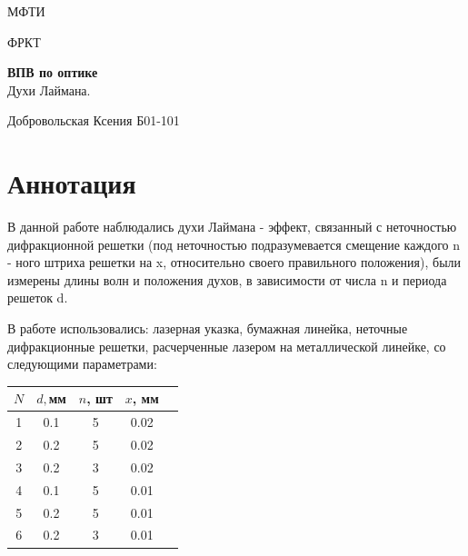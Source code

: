 \documentclass[a4paper,12pt]{article}
\date{\today}
\begin{document}
\begin{titlepage}
	\begin{center}
		{\large МФТИ}
	\end{center}
	\begin{center}
		{\large ФРКТ}
	\end{center}
	
	
	\vspace{4.5cm}
	{\huge
		\begin{center}
			{\bf ВПВ по оптике}\\
			Духи Лаймана.
		  
		

		\end{center}
	}
	\vspace{9cm}
	\begin{flushright}
		{\LARGE  Добровольская Ксения 
			\vspace{0.2cm}
			Б01-101}
	\end{flushright}
	\vspace{8cm}
	
\end{titlepage}

\section{Аннотация}

  В данной работе наблюдались духи Лаймана - эффект, связанный с неточностью дифракционной решетки (под неточностью подразумевается смещение каждого n - ного штриха решетки на x, относительно своего правильного положения), были измерены длины волн и положения духов, в зависимости от числа n и периода решеток d.
  
  
  В работе использовались: лазерная указка, бумажная линейка, неточные дифракционные решетки, расчерченные лазером на металлической линейке, со следующими параметрами:
  
  
  \begin{table}[H]
\begin{center}
\begin{tabular}{|c|c|c|c|c|}
\hline $N $&$d,$мм&$n $, шт&$x$, мм\\
\hline 1&0.1&5&0.02\\
\hline 2&0.2&5&0.02\\
\hline 3&0.2&3&0.02\\
\hline 4&0.1&5&0.01\\
\hline 5&0.2&5&0.01\\
\hline 6&0.2&3&0.01\\

\hline 
\end{tabular}
\end{center}
\end{table}
  
\end{document}
